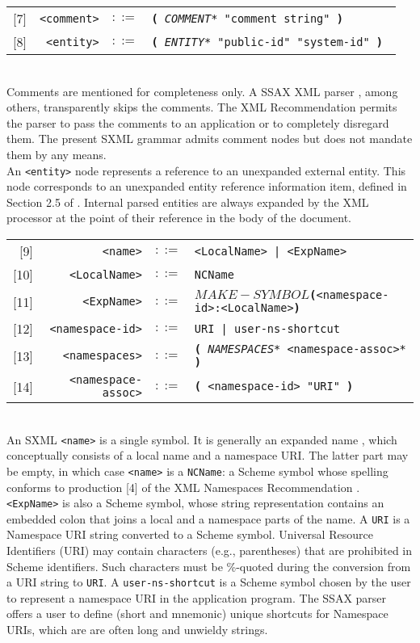 \documentclass[10pt]{article}
\begin{document}
\begin{tabular}{rrcp{2.8in}}
{[}7{]} & \texttt{<comment>} &  $::=$ & \texttt{\textbf{(} {\itshape *COMMENT*} "comment string" \textbf{)} } \\
{[}8{]} & \texttt{<entity>} &  $::=$ & \texttt{\textbf{(} {\itshape *ENTITY*} "public-id" "system-id" \textbf{)} } \\
\end{tabular}
\\
Comments are mentioned for completeness only. A SSAX XML parser
\cite{SSAX}, among others, transparently skips the comments.
The XML Recommendation permits the parser to pass the comments to
an application or to completely disregard them. The present SXML grammar
admits comment nodes but does not mandate them by any means.\\ An \texttt{<entity>} node represents a reference to an
unexpanded external entity. This node corresponds to an unexpanded
entity reference information item, defined in Section 2.5 of \cite{XML Infoset}. Internal parsed entities are always expanded by the
XML processor at the point of their reference in the body of the
document.

\begin{tabular}{rrcp{2.8in}}
{[}9{]} & \texttt{<name>} &  $::=$ & \texttt{<LocalName> | <ExpName> } \\
{[}10{]} & \texttt{<LocalName>} &  $::=$ & \texttt{NCName } \\
{[}11{]} & \texttt{<ExpName>} &  $::=$ & \texttt{\textbf{$MAKE-SYMBOL$(}<namespace-id>:<LocalName>\textbf{)} } \\
{[}12{]} & \texttt{<namespace-id>} &  $::=$ & \texttt{URI | user-ns-shortcut } \\
{[}13{]} & \texttt{<namespaces>} &  $::=$ & \texttt{\textbf{(} {\itshape *NAMESPACES*} <namespace-assoc>* \textbf{)} } \\
{[}14{]} & \texttt{<namespace-assoc>} &  $::=$ & \texttt{\textbf{(} <namespace-id> "URI" \textbf{)} } \\
\end{tabular}
\\
An SXML \texttt{<name>} is a single symbol. It is generally an expanded
name \cite{XML Namespaces}, which conceptually consists of a
local name and a namespace URI. The latter part may be empty, in which
case
\texttt{<name>} is a \texttt{NCName}: a Scheme
symbol whose spelling conforms to production [4] of the XML Namespaces
Recommendation \cite{XML Namespaces}. \texttt{<ExpName>} is also a Scheme symbol, whose string representation
contains an embedded colon that joins a local and a namespace
parts of the name. A \texttt{URI} is a Namespace URI
string converted to a Scheme symbol. Universal Resource Identifiers (URI)
may contain characters (e.g., parentheses) that are prohibited
in Scheme identifiers. Such characters must be \%-quoted during the
conversion from a URI string to \texttt{URI}. A \texttt{user-ns-shortcut} is a Scheme symbol chosen by the user to represent a namespace URI in the application program. The SSAX parser offers a user to define (short and mnemonic) unique shortcuts for Namespace URIs, which are are often long and unwieldy
strings.
\end{document}
